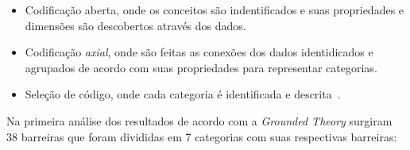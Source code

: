 \begin{itemize}

\item Codificação aberta, onde os conceitos são indentificados e suas propriedades e dimensões
são descobertos através dos dados.

\item Codificação \textit{axial}, onde são feitas as conexões dos dados identidicados e 
agrupados de acordo com suas propriedades para representar categorias.

\item Seleção de código, onde cada categoria é identificada e descrita~\cite{strauss1998basics}.

\end{itemize}

Na primeira análise dos resultados de acordo com a \textit{Grounded Theory} surgiram 
38 barreiras que foram divididas em 7 categorias com suas respectivas barreiras:

